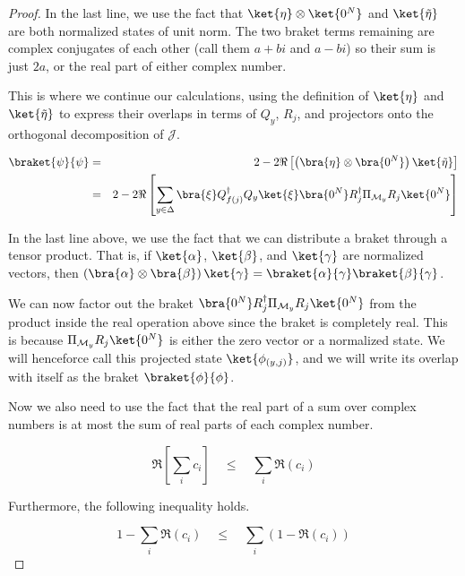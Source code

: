 \begin{proof}
In the last line, we use the fact that $\ket{\eta} \otimes \ket{0^N}$ and
$\ket{\tilde{\eta}}$ are both normalized states of unit norm. The two braket
terms remaining are complex conjugates of each other (call them $a+bi$ and
$a-bi$) so their sum is just $2a$, or the real part of either complex number.

This is where we continue our calculations, using the definition of $\ket{\eta}$
and $\ket{\tilde{\eta}}$ to express their overlaps in terms of $Q_y$,
$R_j$, and projectors onto the orthogonal decomposition of $\mathcal{J}$.

\begin{eqnarray}
\braket{\psi}{\psi} & = & 2 - 2\Re\left[ \left(\bra{\eta} \otimes \bra{0^N}\right) \ket{\tilde{\eta}} \right] \\
                    & = & 2 - 2\Re\left[ \sum_{y \in \Delta} \bra{\xi}Q_{f(j)}^{\dagger}Q_y \ket{\xi}
                                                             \bra{0^N}R_j^{\dagger}\Pi_{\mathcal{M}_y}R_j\ket{0^N} \right] \label{eqn:sym-real}
\end{eqnarray}

In the last line above, we use the fact that we can distribute a braket
through a tensor product. That is, if $\ket{\alpha}$, $\ket{\beta}$, and
$\ket{\gamma}$ are normalized vectors, then
$\left( \bra{\alpha} \otimes \bra{\beta}\right) \ket{\gamma} = 
 \braket{\alpha}{\gamma}\braket{\beta}{\gamma}$.
 
We can now factor out the braket
$\bra{0^N}R_j^{\dagger}\Pi_{\mathcal{M}_y}R_j\ket{0^N}$ from the product
inside the real operation above since the braket is completely real. This is
because $\Pi_{\mathcal{M}_y}R_j \ket{0^N}$ is either the zero vector or
a normalized state. We will henceforce call this projected state
$\ket{\phi_{(y,j)}}$, and we will write its overlap with itself
as the braket $\braket{\phi}{\phi}$.

Now we also need to use the fact that the real part of a sum over complex
numbers is at most the sum of real parts of each complex number.

\begin{equation}
\Re\left[ \sum_{i} c_i \right] \quad \le \quad \sum_{i} \Re( c_i )
\end{equation}

Furthermore, the following inequality holds.

\begin{equation}
1 - \sum_{i} \Re(c_i) \quad \le \quad \sum_{i} \left(1 - \Re(c_i) \right)
\end{equation}


\end{proof}
